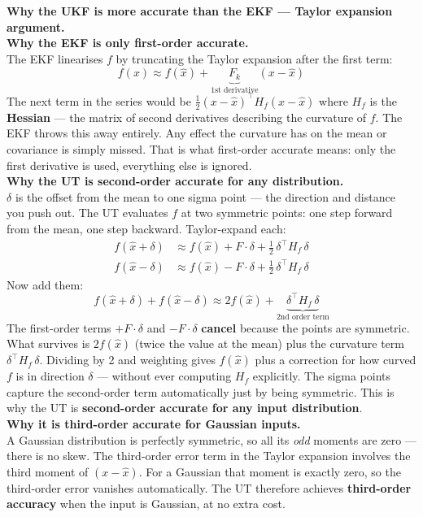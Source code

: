 \documentclass[12pt, a4paper]{article}
\begin{document}
\begin{notebox}
  \textbf{Why the UKF is more accurate than the EKF --- Taylor
  expansion argument.}\\[6pt]

  \textbf{Why the EKF is only first-order accurate.}\\
  The EKF linearises $f$ by truncating the Taylor expansion after
  the first term:
  \[
    f(x) \approx f(\hat{x}) + \underbrace{F_k}_{\text{1st derivative}}(x - \hat{x})
  \]
  The next term in the series would be
  $\frac{1}{2}(x-\hat{x})^\top H_f (x-\hat{x})$
  where $H_f$ is the \textbf{Hessian} --- the matrix of second
  derivatives describing the curvature of $f$.
  The EKF throws this away entirely.
  Any effect the curvature has on the mean or covariance is simply
  missed. That is what first-order accurate means: only the first
  derivative is used, everything else is ignored.\\[6pt]

  \textbf{Why the UT is second-order accurate for any distribution.}\\
  $\delta$ is the offset from the mean to one sigma point --- the
  direction and distance you push out.
  The UT evaluates $f$ at two symmetric points: one step forward
  from the mean, one step backward.
  Taylor-expand each:
  \begin{align*}
    f(\hat{x}+\delta) &\approx f(\hat{x}) + F\cdot\delta
      + \tfrac{1}{2}\,\delta^\top H_f\,\delta \\
    f(\hat{x}-\delta) &\approx f(\hat{x}) - F\cdot\delta
      + \tfrac{1}{2}\,\delta^\top H_f\,\delta
  \end{align*}
  Now add them:
  \[
    f(\hat{x}+\delta) + f(\hat{x}-\delta)
    \approx 2f(\hat{x}) + \underbrace{\delta^\top H_f\,\delta}_{\text{2nd order term}}
  \]
  The first-order terms $+F\cdot\delta$ and $-F\cdot\delta$
  \textbf{cancel} because the points are symmetric.
  What survives is $2f(\hat{x})$ (twice the value at the mean)
  plus the curvature term $\delta^\top H_f\,\delta$.
  Dividing by 2 and weighting gives $f(\hat{x})$ plus a correction
  for how curved $f$ is in direction $\delta$ --- without ever
  computing $H_f$ explicitly.
  The sigma points capture the second-order term automatically just
  by being symmetric.
  This is why the UT is \textbf{second-order accurate for any input
  distribution}.\\[6pt]

  \textbf{Why it is third-order accurate for Gaussian inputs.}\\
  A Gaussian distribution is perfectly symmetric, so all its
  \emph{odd} moments are zero --- there is no skew.
  The third-order error term in the Taylor expansion involves the
  third moment of $(x-\hat{x})$.
  For a Gaussian that moment is exactly zero, so the third-order
  error vanishes automatically.
  The UT therefore achieves \textbf{third-order accuracy} when the
  input is Gaussian, at no extra cost.\\[6pt]


\end{notebox}
\end{document}
